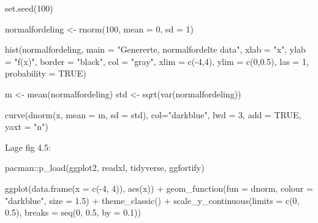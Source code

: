 \documentclass[
]{book}
\newenvironment{Shaded}{\begin{snugshade}}{\end{snugshade}}
\newcommand{\AttributeTok}[1]{\textcolor[rgb]{0.77,0.63,0.00}{#1}}
\newcommand{\ConstantTok}[1]{\textcolor[rgb]{0.00,0.00,0.00}{#1}}
\newcommand{\DecValTok}[1]{\textcolor[rgb]{0.00,0.00,0.81}{#1}}
\newcommand{\FloatTok}[1]{\textcolor[rgb]{0.00,0.00,0.81}{#1}}
\newcommand{\FunctionTok}[1]{\textcolor[rgb]{0.00,0.00,0.00}{#1}}
\newcommand{\NormalTok}[1]{#1}
\newcommand{\OtherTok}[1]{\textcolor[rgb]{0.56,0.35,0.01}{#1}}
\newcommand{\SpecialCharTok}[1]{\textcolor[rgb]{0.00,0.00,0.00}{#1}}
\newcommand{\StringTok}[1]{\textcolor[rgb]{0.31,0.60,0.02}{#1}}
\begin{document}
\begin{Shaded}
\begin{Highlighting}[]
\FunctionTok{set.seed}\NormalTok{(}\DecValTok{100}\NormalTok{)}

\NormalTok{normalfordeling }\OtherTok{\textless{}{-}} \FunctionTok{rnorm}\NormalTok{(}\DecValTok{100}\NormalTok{, }\AttributeTok{mean =} \DecValTok{0}\NormalTok{, }\AttributeTok{sd =} \DecValTok{1}\NormalTok{)}

\FunctionTok{hist}\NormalTok{(normalfordeling, }
     \AttributeTok{main =} \StringTok{"Genererte, normalfordelte data"}\NormalTok{, }
     \AttributeTok{xlab =} \StringTok{"x"}\NormalTok{, }
     \AttributeTok{ylab =} \StringTok{"f(x)"}\NormalTok{,}
     \AttributeTok{border =} \StringTok{"black"}\NormalTok{, }
     \AttributeTok{col =} \StringTok{"gray"}\NormalTok{,}
     \AttributeTok{xlim =} \FunctionTok{c}\NormalTok{(}\SpecialCharTok{{-}}\DecValTok{4}\NormalTok{,}\DecValTok{4}\NormalTok{),}
     \AttributeTok{ylim =} \FunctionTok{c}\NormalTok{(}\DecValTok{0}\NormalTok{,}\FloatTok{0.5}\NormalTok{),}
     \AttributeTok{las =} \DecValTok{1}\NormalTok{, }
     \AttributeTok{probability =} \ConstantTok{TRUE}\NormalTok{)}

\NormalTok{m }\OtherTok{\textless{}{-}} \FunctionTok{mean}\NormalTok{(normalfordeling)}
\NormalTok{std }\OtherTok{\textless{}{-}} \FunctionTok{sqrt}\NormalTok{(}\FunctionTok{var}\NormalTok{(normalfordeling))}

\FunctionTok{curve}\NormalTok{(}\FunctionTok{dnorm}\NormalTok{(x, }\AttributeTok{mean =}\NormalTok{ m, }\AttributeTok{sd =}\NormalTok{ std), }
      \AttributeTok{col=}\StringTok{"darkblue"}\NormalTok{, }\AttributeTok{lwd =} \DecValTok{3}\NormalTok{, }\AttributeTok{add =} \ConstantTok{TRUE}\NormalTok{, }\AttributeTok{yaxt =} \StringTok{"n"}\NormalTok{)}
\end{Highlighting}
\end{Shaded}

Lage fig 4.5:

\begin{Shaded}
\begin{Highlighting}[]
\NormalTok{pacman}\SpecialCharTok{::}\FunctionTok{p\_load}\NormalTok{(ggplot2, readxl, tidyverse, ggfortify)}

\FunctionTok{ggplot}\NormalTok{(}\FunctionTok{data.frame}\NormalTok{(}\AttributeTok{x =} \FunctionTok{c}\NormalTok{(}\SpecialCharTok{{-}}\DecValTok{4}\NormalTok{, }\DecValTok{4}\NormalTok{)), }\FunctionTok{aes}\NormalTok{(x)) }\SpecialCharTok{+}
  \FunctionTok{geom\_function}\NormalTok{(}\AttributeTok{fun =}\NormalTok{ dnorm, }\AttributeTok{colour =} \StringTok{"darkblue"}\NormalTok{, }\AttributeTok{size =} \FloatTok{1.5}\NormalTok{) }\SpecialCharTok{+}
  \FunctionTok{theme\_classic}\NormalTok{() }\SpecialCharTok{+}
  \FunctionTok{scale\_y\_continuous}\NormalTok{(}\AttributeTok{limits =} \FunctionTok{c}\NormalTok{(}\DecValTok{0}\NormalTok{, }\FloatTok{0.5}\NormalTok{), }\AttributeTok{breaks =} \FunctionTok{seq}\NormalTok{(}\DecValTok{0}\NormalTok{, }\FloatTok{0.5}\NormalTok{, }\AttributeTok{by =} \FloatTok{0.1}\NormalTok{))}
\end{Highlighting}
\end{Shaded}
\end{document}
